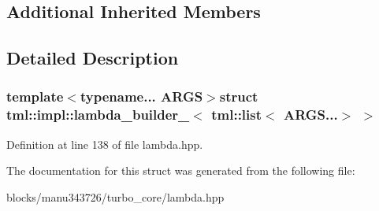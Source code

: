\subsection*{Additional Inherited Members}


\subsection{Detailed Description}
\subsubsection*{template$<$typename... A\+R\+G\+S$>$struct tml\+::impl\+::lambda\+\_\+builder\+\_$<$ tml\+::list$<$ A\+R\+G\+S...$>$ $>$}



Definition at line 138 of file lambda.\+hpp.



The documentation for this struct was generated from the following file\+:\begin{DoxyCompactItemize}
\item 
blocks/manu343726/turbo\+\_\+core/lambda.\+hpp\end{DoxyCompactItemize}
